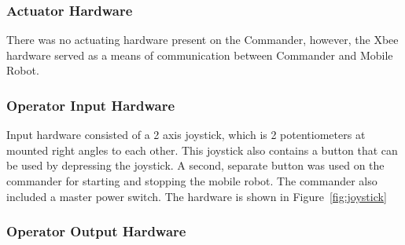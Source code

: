 \documentclass[11pt,a4paper]{article}
\begin{document}
    \subsubsection{Actuator Hardware}
      There was no actuating hardware present on the Commander, however, the Xbee hardware served as a means of communication between Commander and Mobile Robot.
    \subsubsection{Operator Input Hardware}
      Input hardware consisted of a 2 axis joystick, which is 2 potentiometers at mounted right angles to each other. This joystick also contains a button that can be used by depressing the joystick. A second, separate button was used on the commander for starting and stopping the mobile robot. The commander also included a master power switch. The hardware is shown in Figure~\ref{fig:joystick}
      \pagebreak
    \subsubsection{Operator Output Hardware}
\end{document}
